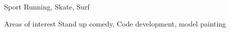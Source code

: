 
\begin{cvskills}

  \cvskill
    {Sport} %
    {Running, Skate, Surf} %
    
  \cvskill
    {Areas of interest} %
    {Stand up comedy, Code development, model painting} %
    
\end{cvskills}